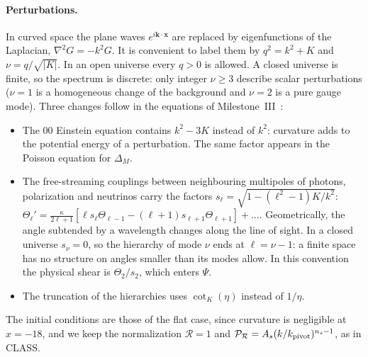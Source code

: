 \paragraph*{Perturbations.} In curved space the plane waves $e^{i\bm k\cdot\bm x}$ are replaced by eigenfunctions of
the Laplacian, $\nabla^2G=-k^2G$. It is convenient to label them by $q^2=k^2+K$ and $\nu=q/\sqrt{|K|}$. In an open
universe every $q>0$ is allowed. A closed universe is finite, so the spectrum is discrete: only integer $\nu\ge3$
describe scalar perturbations ($\nu=1$ is a homogeneous change of the background and $\nu=2$ is a pure gauge
mode). Three changes follow in the equations of
Milestone~III~\cite{HuSeljak1998,Lesgourgues2014}:
\begin{itemize}
\item The $00$ Einstein equation contains $k^2-3K$ instead of $k^2$: curvature adds to the potential energy of a
      perturbation. The same factor appears in the Poisson equation for $\Delta_M$.
\item The free-streaming couplings between neighbouring multipoles of photons, polarization and neutrinos carry the
      factors $s_\ell=\sqrt{1-(\ell^2-1)K/k^2}$:
      $\Theta_\ell'=\frac{\kappa}{2\ell+1}[\ell s_\ell\Theta_{\ell-1}-(\ell+1)s_{\ell+1}\Theta_{\ell+1}]+\dots$. Geometrically,
      the angle subtended by a wavelength changes along the line of sight. In a closed universe $s_\nu=0$, so the
      hierarchy of mode $\nu$ ends at $\ell=\nu-1$: a finite space has no structure on angles smaller than its modes
      allow. In this convention the physical shear is $\Theta_2/s_2$, which enters $\Psi$.
\item The truncation of the hierarchies uses $\cot_K(\eta)$ instead of $1/\eta$.
\end{itemize}
The initial conditions are those of the flat case, since curvature is negligible at $x=-18$, and we keep the
normalization $\mathcal{R}=1$ and $\mathcal{P}_{\mathcal{R}}=A_s(k/k_{\rm pivot})^{n_s-1}$, as in CLASS.

